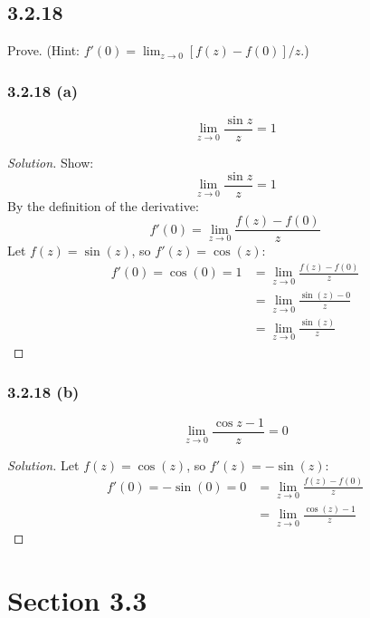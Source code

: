 \documentclass{article}
\newenvironment{solution}{
\begin{proof}[Solution]}{
\end{proof}}
\begin{document}
\subsection*{3.2.18}
Prove. (Hint: $f'(0) = \lim_{z \to 0} [f(z) - f(0)]/z$.)

\subsubsection*{3.2.18 (a)}
\[ \lim_{z \to 0} \frac{\sin z}{z} = 1 \]
\begin{solution}
  Show:
  \[
    \lim_{z\to0}\frac{\sin z}{z}=1
  \]
  By the definition of the derivative:
  \[
    f'(0)=\lim_{z\to0}\frac{f(z)-f(0)}{z}
  \]
  Let $f(z)=\sin(z)$, so $f'(z)=\cos(z)$:
  \begin{align*}
    f'(0)=\cos(0)=1 & = \lim_{z\to0}\frac{f(z)-f(0)}{z} \\
    & = \lim_{z\to0}\frac{\sin(z)-0}{z} \\
    & = \lim_{z\to0}\frac{\sin(z)}{z}
  \end{align*}
\end{solution}

\subsubsection*{3.2.18 (b)}
\[ \lim_{z \to 0} \frac{\cos z - 1}{z} = 0 \]
\begin{solution}
  Let $f(z)=\cos(z)$, so $f'(z)=-\sin(z)$:
  \begin{align*}
    f'(0)=-\sin(0)=0 & = \lim_{z\to0}\frac{f(z)-f(0)}{z} \\
    & = \lim_{z\to0}\frac{\cos(z)-1}{z}
  \end{align*}
\end{solution}

\section*{Section 3.3}
\end{document}
